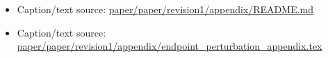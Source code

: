 \begin{itemize}[leftmargin=1.4em,noitemsep]
\item Caption/text source: \begingroup\scriptsize\url{paper/paper/revision1/appendix/README.md}\endgroup
\item Caption/text source: \begingroup\scriptsize\url{paper/paper/revision1/appendix/endpoint_perturbation_appendix.tex}\endgroup
\end{itemize}
